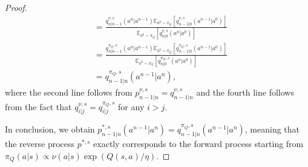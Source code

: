\begin{proof}
\begin{equation}
\begin{aligned}
        &=\frac{q^{\nu,s}_{n|n-1}(a^n|a^{n-1})\mathbb{E}_{a^0\sim\pi_Q}\left[q^{\nu,s}_{n-1|0}(a^{n-1}|a^0)\right]}{\mathbb{E}_{a^0\sim\pi_Q}\left[q^{\nu,s}_{n|0}(a^n|a^0)\right]}\\
        &=\frac{q^{\pi_Q,s}_{n|n-1}(a^n|a^{n-1})\mathbb{E}_{a^0\sim\pi_Q}\left[q^{\pi_Q,s}_{n-1|0}(a^{n-1}|a^0)\right]}{\mathbb{E}_{a^0\sim\pi_Q}\left[q^{\pi_Q,s}_{n|0}(a^n|a^0)\right]}\\
        &=q^{\pi_Q, s}_{n-1|n}(a^{n-1}|a^n),
    \end{aligned}
\end{equation}
where the second line follows from $p^{\nu,s}_{n-1|n}=q^{\nu,s}_{n-1|n}$ and the fourth line follows from the fact that $q^{\nu,s}_{i|j}=q^{\pi_Q,s}_{i|j}$ for any $i>j$. 

In conclusion, we obtain $p^{*, s}_{n-1|n}(a^{n-1}|a^n)=q^{\pi_Q, s}_{n-1|n}(a^{n-1}|a^n)$, meaning that the reverse process $p^{*,s}$ exactly corresponds to the forward process starting from $\pi_Q(a|s)\propto \nu(a|s)\exp(Q(s, a)/\eta)$. 




\end{proof}
